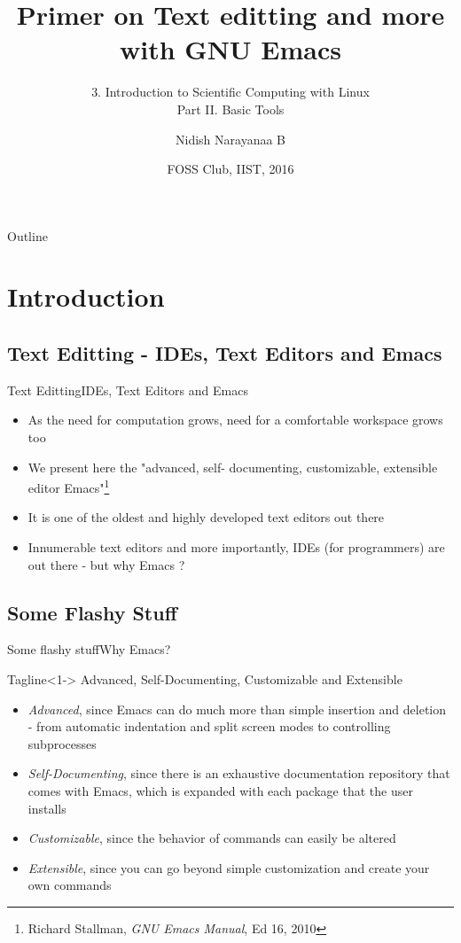 \documentclass{beamer}
\title{Primer on Text editting and more with GNU Emacs}
\subtitle{3. Introduction to Scientific Computing with Linux\\Part II. Basic Tools}
\author{Nidish Narayanaa B\inst{1}}%
\institute[Universities of Somewhere and Elsewhere] %
{
  \inst{1}%
  Department of Aerospace Engineering\\
  Indian Institute of Space Science \& Technology, Trivandrum
  }
\date{FOSS Club, IIST, 2016}
\begin{document}
\begin{frame}
  \titlepage
\end{frame}

\begin{frame}{Outline}
  \tableofcontents
\end{frame}

\section{Introduction}

\subsection{Text Editting - IDEs, Text Editors and Emacs}

\begin{frame}{Text Editting}{IDEs, Text Editors and Emacs}
  \begin{itemize}
  \item {
	As the need for computation grows, need for a comfortable workspace grows too
  }
  \item {
	We present here the "advanced, self-
documenting, customizable, extensible editor Emacs"\footnote{Richard Stallman, \emph{GNU Emacs Manual}, Ed 16, 2010 }
  }
  \item {
  	It is one of the oldest and highly developed text editors out there
  	}
  \item {
  	Innumerable text editors and more importantly, IDEs (for programmers) are out there - but why Emacs ?
  	}
  \end{itemize}
\end{frame}

\subsection{Some Flashy Stuff}
\begin{frame}{Some flashy stuff}{Why Emacs?}
\begin{block}{Tagline}<1->
Advanced, Self-Documenting, Customizable and Extensible
\end{block}
\begin{itemize}
\item<2-> {
\emph{Advanced}, since Emacs can do much more than simple insertion and deletion - from automatic indentation and split screen modes to controlling subprocesses 
}
\item<3-> {
\emph{Self-Documenting}, since there is an exhaustive documentation repository that comes with Emacs, which is expanded with each package that the user installs
}
\item<4-> {
\emph{Customizable}, since the behavior of commands can easily be altered
}
\item<5-> {
\emph{Extensible}, since you can go beyond simple customization and create your own commands
}
\end{itemize}
\end{frame}
\end{document}
